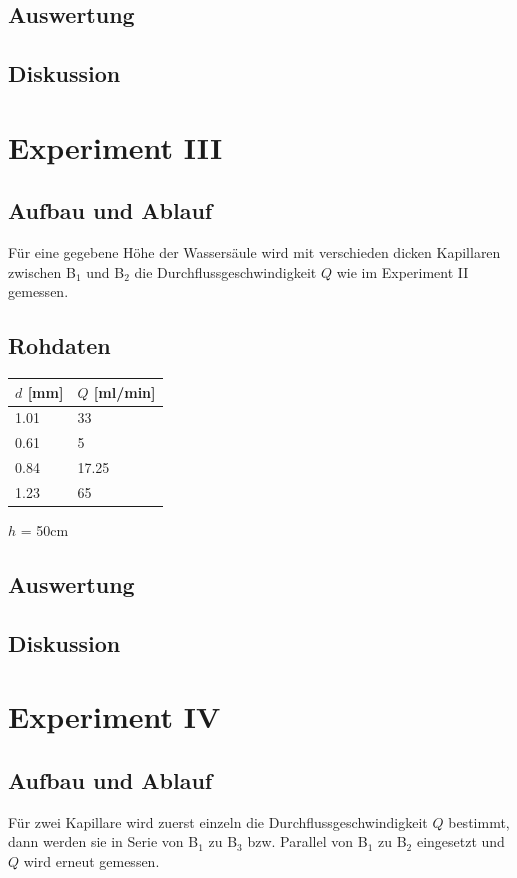 \documentclass[12pt,a4paper]{article}
\newcommand{\subscript}[1]{$_{#1}$}
\newcommand{\B}[1]{B\subscript{#1}}
\begin{document}
\subsection*{Auswertung}

\subsection*{Diskussion}


\section*{Experiment III}

\subsection*{Aufbau und Ablauf}
F\"ur eine gegebene H\"ohe der Wassers\"aule wird mit verschieden dicken Kapillaren zwischen \B{1} und \B{2} die Durchflussgeschwindigkeit $Q$ wie im Experiment II gemessen.

\subsection*{Rohdaten}
\begin{tabular}{|l|l|}
\hline
$d$ [mm]&$Q$ [ml/min]\\
\hline
1.01&33\\
0.61&5\\
0.84&17.25\\
1.23&65\\
\hline
\end{tabular}

\vspace{5pt}
$h$ = 50cm

\subsection*{Auswertung}

\subsection*{Diskussion}


\section*{Experiment IV}

\subsection*{Aufbau und Ablauf}
F\"ur zwei Kapillare wird zuerst einzeln die Durchflussgeschwindigkeit $Q$ bestimmt, dann werden sie in Serie von \B{1} zu \B{3} bzw. Parallel von \B{1} zu \B{2} eingesetzt und $Q$ wird erneut gemessen.
\end{document}
